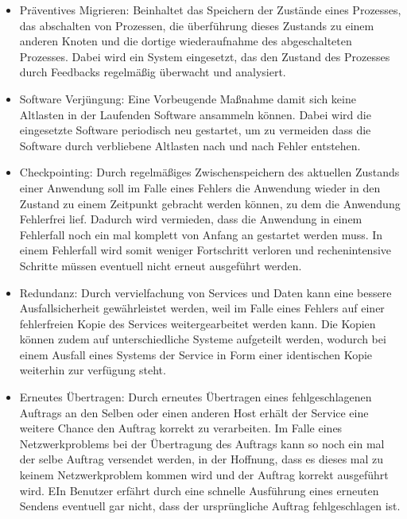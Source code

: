 \begin{itemize}
\item
Präventives Migrieren: Beinhaltet das Speichern der Zustände eines Prozesses, das abschalten von Prozessen, die überführung dieses Zustands zu einem anderen Knoten und die dortige wiederaufnahme des abgeschalteten Prozesses.
Dabei wird ein System eingesetzt, das den Zustand des Prozesses durch Feedbacks regelmäßig überwacht und analysiert. 

\item
Software Verjüngung: Eine Vorbeugende Maßnahme damit sich keine Altlasten in der Laufenden Software ansammeln können. Dabei wird die eingesetzte Software periodisch neu gestartet, um zu vermeiden dass die Software durch verbliebene Altlasten nach und nach Fehler entstehen.
\item
Checkpointing: Durch regelmäßiges Zwischenspeichern des aktuellen Zustands einer Anwendung soll im Falle eines Fehlers die Anwendung wieder in den Zustand zu einem Zeitpunkt gebracht werden können, zu dem die Anwendung Fehlerfrei lief. Dadurch wird vermieden, dass die Anwendung in einem Fehlerfall noch ein mal komplett von Anfang an gestartet werden muss. In einem Fehlerfall wird somit weniger Fortschritt verloren und rechenintensive Schritte müssen eventuell nicht erneut ausgeführt werden.
\item
Redundanz: Durch vervielfachung von Services und Daten kann eine bessere Ausfallsicherheit gewährleistet werden, weil im Falle eines Fehlers auf einer fehlerfreien Kopie des Services weitergearbeitet werden kann. Die Kopien können zudem auf unterschiedliche Systeme aufgeteilt werden, wodurch bei einem Ausfall eines Systems der Service in Form einer identischen Kopie weiterhin zur verfügung steht.
\item
Erneutes Übertragen: Durch erneutes Übertragen eines fehlgeschlagenen Auftrags an den Selben oder einen anderen Host erhält der Service eine weitere Chance den Auftrag korrekt zu verarbeiten. Im Falle eines Netzwerkproblems bei der Übertragung des Auftrags kann so noch ein mal der selbe Auftrag versendet werden, in der Hoffnung, dass es dieses mal zu keinem Netzwerkproblem kommen wird und der Auftrag korrekt ausgeführt wird. EIn Benutzer erfährt durch eine schnelle Ausführung eines erneuten Sendens eventuell gar nicht, dass der ursprüngliche Auftrag fehlgeschlagen ist.

\end{itemize}

